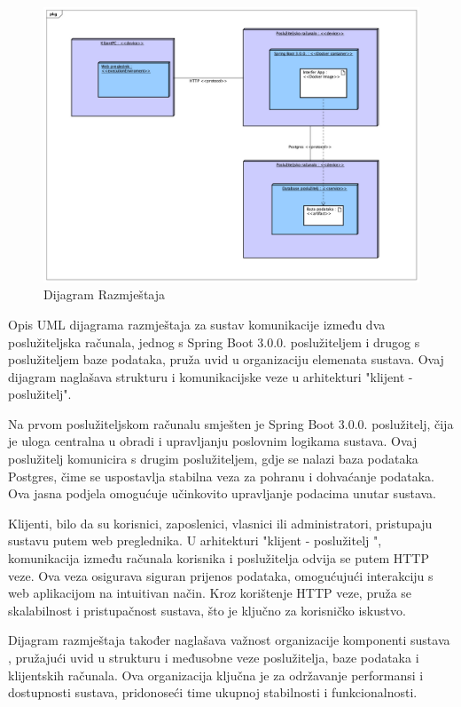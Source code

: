 \begin{figure}[H]
	\includegraphics[scale=0.3]{slike/dijagram_razmjestaja.jpeg}
	\centering
	\caption{Dijagram Razmještaja}
	\label{fig:dijagram_razmjestaja}
\end{figure}

Opis UML dijagrama razmještaja za sustav komunikacije između dva 
poslužiteljska računala, jednog s Spring Boot 3.0.0. poslužiteljem i drugog s 
poslužiteljem baze podataka, pruža uvid u organizaciju elemenata sustava. Ovaj 
dijagram naglašava strukturu i komunikacijske veze u arhitekturi "klijent - 
poslužitelj".

Na prvom poslužiteljskom računalu smješten je Spring Boot 3.0.0. poslužitelj, 
čija je uloga centralna u obradi i upravljanju poslovnim logikama sustava. 
Ovaj poslužitelj komunicira s drugim poslužiteljem, gdje se nalazi baza 
podataka Postgres, čime se uspostavlja stabilna veza za pohranu i dohvaćanje 
podataka. Ova jasna podjela omogućuje učinkovito upravljanje podacima unutar 
sustava.

Klijenti, bilo da su korisnici, zaposlenici, vlasnici ili administratori, 
pristupaju sustavu putem web preglednika. U arhitekturi "klijent - poslužitelj
", komunikacija između računala korisnika i poslužitelja odvija se putem HTTP 
veze. Ova veza osigurava siguran prijenos podataka, omogućujući interakciju s 
web aplikacijom na intuitivan način. Kroz korištenje HTTP veze, pruža se 
skalabilnost i pristupačnost sustava, što je ključno za korisničko 
iskustvo.

Dijagram razmještaja također naglašava važnost organizacije komponenti sustava
, pružajući uvid u strukturu i međusobne veze poslužitelja, baze podataka i 
klijentskih računala. Ova organizacija ključna je za održavanje performansi i 
dostupnosti sustava, pridonoseći time ukupnoj stabilnosti i 
funkcionalnosti.

